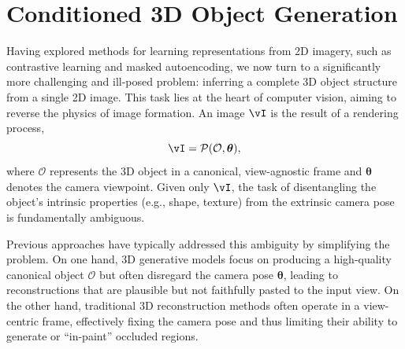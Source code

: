 \documentclass[../../book-main.tex]{subfiles}
\begin{document}
\section{Conditioned 3D Object Generation}

\newcommand{\pose}{\boldsymbol{\theta}}
\newcommand{\object}{\mathcal{O}}
\newcommand{\Image}{\mathbf{I}}
\newcommand{\image}{\vI}
\newcommand{\render}{\mathbf{\mathcal{P}}}
\newcommand{\latent}{\mathbf{z}}
\newcommand{\timestep}{t}
\newcommand{\latentt}{\mathbf{z}_{\timestep}}
\newcommand{\latentzero}{\mathbf{z}_{0}}
\newcommand{\noise}{\boldsymbol{\epsilon}}
\newcommand{\velocity}{\mathbf{v}}
\newcommand{\parameter}{\phi}
\newcommand{\encoder}{\varphi}
\newcommand{\point}{\mathbf{x}}
\newcommand{\pixcoord}{\mathbf{u}}
\newcommand{\feat}{\mathbf{f}}
\newcommand{\sflow}{\mathbf{\mathcal{G}_{S}}}
\newcommand{\lflow}{\mathbf{\mathcal{G}_{L}}}
\newcommand{\transpose}{\operatorname{T}}
\newcommand{\Grid}{\mG}
\newcommand{\sgrid}{\mS}
\newcommand{\numpts}{L}
\newcommand{\sres}{D}
\newcommand{\vaeencoder}{\psi}
\newcommand{\trellis}{{\textsc{TRELLIS}}\xspace}
\newcommand{\interp}{\operatorname{BilinearInterp}}
\newcommand{\slatenc}{\operatorname{SlatEncoder}}
\newcommand{\twotothree}{$2$D $\to$ $3$D\xspace}
\newcommand{\threetotwo}{$2$D $\to$ $3$D\xspace}
\newcommand{\low}{\mathrm{l}}
\newcommand{\high}{\mathrm{h}}


Having explored methods for learning representations from 2D imagery, such as contrastive learning and masked autoencoding, we now turn to a significantly more challenging and ill-posed problem: inferring a complete 3D object structure from a single 2D image. This task lies at the heart of computer vision, aiming to reverse the physics of image formation. An image $\image$ is the result of a rendering process,
\[
\image = \render(\object, \pose),
\]
where $\object$ represents the 3D object in a canonical, view-agnostic frame and $\pose$ denotes the camera viewpoint. Given only $\image$, the task of disentangling the object's intrinsic properties (e.g., shape, texture) from the extrinsic camera pose is fundamentally ambiguous.

Previous approaches have typically addressed this ambiguity by simplifying the problem. On one hand, 3D generative models focus on producing a high-quality canonical object $\object$ but often disregard the camera pose $\pose$, leading to reconstructions that are plausible but not faithfully pasted to the input view. On the other hand, traditional 3D reconstruction methods often operate in a view-centric frame, effectively fixing the camera pose and thus limiting their ability to generate or ``in-paint'' occluded regions.
\end{document}
